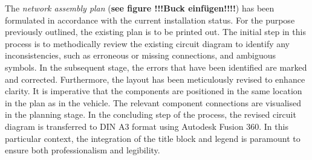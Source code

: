 The \textit{network assembly plan} (\textbf{see figure !!!Buck einfügen!!!!\underline{}}) has been formulated in accordance with the current installation status. For the purpose previously outlined, the existing plan is to be printed out. The initial step in this process is to methodically review the existing circuit diagram to identify any inconsistencies, such as erroneous or missing connections, and ambiguous symbols. In the subsequent stage, the errors that have been identified are marked and corrected. Furthermore, the layout has been meticulously revised to enhance clarity. It is imperative that the components are positioned in the same location in the plan as in the vehicle. The relevant component connections are visualised in the planning stage. In the concluding step of the process, the revised circuit diagram is transferred to DIN A3 format using Autodesk Fusion 360. In this particular context, the integration of the title block and legend is paramount to ensure both professionalism and legibility.

